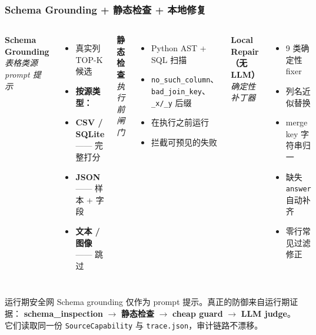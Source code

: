 \documentclass[11pt, aspectratio=169]{beamer}
\begin{document}

\begin{frame}[t]
\frametitle{Schema Grounding + 静态检查 + 本地修复}
\scriptsize

\begin{columns}[T]
\textbf{Schema Grounding}\\
{\textit{表格类源 prompt 提示}}
\begin{itemize}
    \item 真实列 TOP-K 候选
    \item \textbf{按源类型：}
        \item \textbf{CSV / SQLite} —— 完整打分
        \item \textbf{JSON} —— 样本 + 字段
        \item \textbf{文本 / 图像} —— 跳过
\end{itemize}

\textbf{静态检查}\\
{\textit{执行前闸门}}
\begin{itemize}
    \item Python AST + SQL 扫描
    \item \texttt{no\_such\_column}、\texttt{bad\_join\_key}、\texttt{\_x/\_y} 后缀
    \item 在执行之前运行
    \item 拦截可预见的失败
\end{itemize}

\textbf{Local Repair（无 LLM）}\\
{\textit{确定性补丁器}}
\begin{itemize}
    \item 9 类确定性 fixer
    \item 列名近似替换
    \item merge key 字符串归一
    \item 缺失 \texttt{answer} 自动补齐
    \item 零行常见过滤修正
\end{itemize}
\end{columns}

\vspace{0.25em}
\begin{alertblock}{运行期安全网}
Schema grounding 仅作为 prompt 提示。真正的防御来自运行期证据：
\textbf{schema\_inspection} $\to$ \textbf{静态检查} $\to$
\textbf{cheap guard} $\to$ \textbf{LLM judge}。它们读取同一份
\texttt{SourceCapability} 与 \texttt{trace.json}，审计链路不漂移。
\end{alertblock}

\end{frame}
\end{document}
